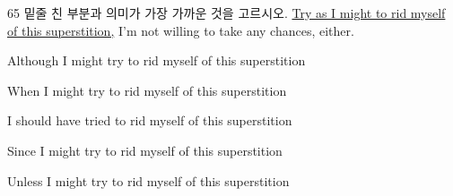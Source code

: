 \begin{question}{65}
밑줄 친 부분과 의미가 가장 가까운 것을 고르시오.
\uline{Try as I might to rid myself of this superstition,} I'm not willing to take any chances, either. \par
\begin{choices}
  \item Although I might try to rid myself of this superstition
  \item When I might try to rid myself of this superstition
  \item I should have tried to rid myself of this superstition
  \item Since I might try to rid myself of this superstition
  \item Unless I might try to rid myself of this superstition
\end{choices}
\end{question}
